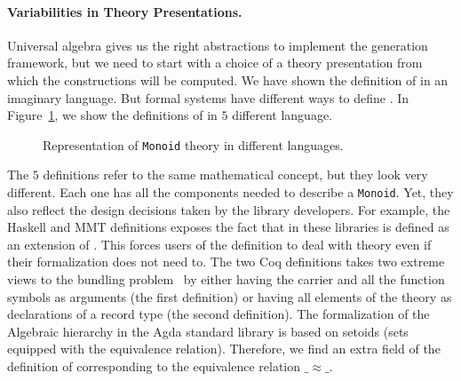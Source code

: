 \paragraph{Variabilities in Theory Presentations.}
Universal algebra gives us the right abstractions to implement the generation framework, but we need to start with a choice of a theory presentation from which the constructions will be computed. We have shown the definition of  in an imaginary language. But formal systems have different ways to define . 
In Figure~\ref{fig:mon-diff-lang}, we show the definitions of  in $5$ different language. 
\begin{figure}
    
    \caption{Representation of \lstinline|Monoid| theory in different languages.}
    \label{fig:mon-diff-lang}
\end{figure}
The $5$ definitions refer to the same mathematical concept, but they look very different. 
Each one has all the components needed to describe a \verb|Monoid|. Yet, they also reflect the design decisions taken by the library developers. 
For example, the Haskell and MMT definitions exposes the fact that \monoid in these libraries is defined as an extension of \semigroup. This forces users of the definition to deal with \semigroup theory even if their formalization does not need to. 
The two Coq definitions takes two extreme views to the bundling problem~\cite{lean2019,alhassy2019,spitters2011type} by either having the carrier and all the function symbols as arguments (the first definition) or having all elements of the theory as declarations of a record type (the second definition). 
The formalization of the Algebraic hierarchy in the Agda standard library is based on setoids (sets equipped with the equivalence relation). Therefore, we find an extra field of the definition of \monoid corresponding to the equivalence relation $\_\approx\_$. 

